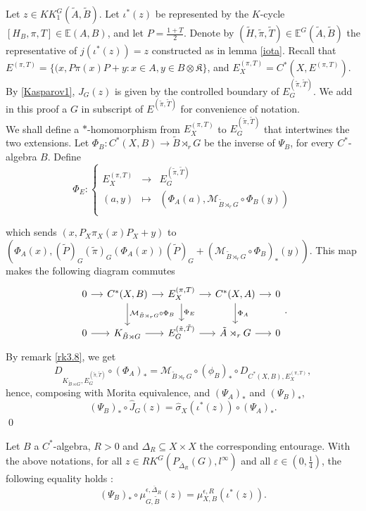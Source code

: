 \begin{dem}
Let $z\in KK_1^G(\tilde A,\tilde B)$. Let $\iota^*(z)$ be represented by the $K$-cycle $[H_{B},\pi,T]\in\mathbb E(A,B)$, and let $P=\frac{1+T}{2}$. Denote by $(\tilde H,\tilde \pi ,\tilde T)\in \mathbb E^G(\tilde A,\tilde B)$ the representative of $j(\iota^*(z))=z$ constructed as in lemma \ref{iota}. Recall that $E^{(\pi,T)} = \{(x,P\pi(x)P+y : x\in A,y\in B\otimes\mathfrak K\}$, and $E^{(\pi,T)}_X=C^*(X,E^{(\pi,T)})$. By \ref{Kasparov1}, $J_G(z)$ is given by the controlled boundary of $E_G^{(\tilde \pi,\tilde T)}$. We add in this proof a $G$ in subscript of $E^{(\tilde \pi,\tilde T)}$ for convenience of notation.\\

We shall define a $*$-homomorphism from $E^{(\pi,T)}_X$ to $E_G^{(\tilde \pi,\tilde T)}$ that intertwines the two extensions. Let $\Phi_B : C^*(X,B)\rightarrow \tilde B\rtimes_r G$ be the inverse of $\Psi_B$, for every $C^*$-algebra $B$. Define 
\[\Phi_E : \left\{
\begin{array}{rcl}
E^{(\pi,T)}_X   & \rightarrow   & E_G^{(\tilde \pi,\tilde T)} \\
(a,y)		& \mapsto	& (\Phi_A(a),\mathcal M_{\tilde B\rtimes_r G}\circ\Phi_B(y))\\
\end{array}\right.\]

which sends $(x,P_X \pi_X(x)P_X + y)$ to $(\Phi_A(x), (\tilde P)_G(\tilde \pi)_G(\Phi_A(x))(\tilde P)_G+(\mathcal M_{\tilde B\rtimes_r G}\circ\Phi_B)_*(y))$. This map makes the following diagram commutes
\[
\begin{tikzcd}[column sep = small]
0\arrow{r} & C^*(X,B) \arrow{r}\arrow{d}{\mathcal M_{\tilde B\rtimes_r G}\circ\Phi_B} & E^{(\pi,T)}_X  \arrow{r}\arrow{d}{\Phi_E} & 
	C^*(X,A)\arrow{r}\arrow{d}{\Phi_A} & 0 \\
0\arrow{r} & K_{\tilde B\rtimes G}\arrow{r} & E_G^{(\tilde \pi,\tilde T)} \arrow{r}& \tilde A\rtimes_r G\arrow{r} & 0
\end{tikzcd}.
\]
By remark \ref{rk3.8}, we get 
\[D_{K_{\tilde B\rtimes G}, E_G^{(\tilde \pi,\tilde T)}} \circ (\Phi_A)_* =\mathcal M_{\tilde B\rtimes_r G} \circ (\phi_B)_* \circ D_{ C^*(X,B), E^{(\pi,T)}_X},\]
hence, composing with Morita equivalence, and $(\Psi_A)_*$ and $(\Psi_B)_*$,
\[ (\Psi_B)_*\circ \hat J_G(z) = \hat\sigma_X(\iota^*(z)) \circ (\Psi_A)_*.\]
\qed
\end{dem}

\begin{thm}\label{BCCeq}
Let $B$ a $C^*$-algebra, $R>0$ and $\Delta_R\subseteq X\times X$ the corresponding entourage. With the above notations, for all $z\in RK^G(P_{\overline \Delta_R}(G),l^\infty)$ and all $\varepsilon\in(0,\frac{1}{4})$, the following equality holds :
\[(\Psi_B)_*\circ\mu^{\epsilon,\overline\Delta_R}_{G,\tilde B} (z) = \mu_{X,B}^{\epsilon,R}(\iota^*(z)).\]
\end{thm}


